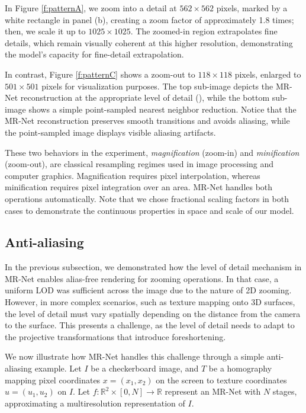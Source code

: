 In Figure \ref{f:patternA}, we zoom into a detail at \(562 \times 562\) pixels, marked by a white rectangle in panel (b), creating a zoom factor of approximately 1.8 times; then, we scale it up to \(1025 \times 1025\). The zoomed-in region extrapolates fine details, which remain visually coherent at this higher resolution, demonstrating the model's capacity for fine-detail extrapolation.

In contrast, Figure \ref{f:patternC} shows a zoom-out to \(118 \times 118\) pixels, enlarged to \(501 \times 501\) pixels for visualization purposes. The top sub-image depicts the MR-Net reconstruction at the appropriate level of detail (), while the bottom sub-image shows a simple point-sampled nearest neighbor reduction. Notice that the MR-Net reconstruction preserves smooth transitions and avoids aliasing, while the point-sampled image displays visible aliasing artifacts.

These two behaviors in the experiment, \textit{magnification} (zoom-in) and \textit{minification} (zoom-out), are classical resampling regimes used in image processing \citep{pixel} and computer graphics. Magnification requires pixel interpolation, whereas minification requires pixel integration over an area. MR-Net handles both operations automatically. Note that we chose fractional scaling factors in both cases to demonstrate the continuous properties in space and scale of our model.

\subsection{Anti-aliasing}

In the previous subsection, we demonstrated how the level of detail mechanism in MR-Net enables alias-free rendering for zooming operations. In that case, a uniform LOD was sufficient across the image due to the nature of 2D zooming. However, in more complex scenarios, such as texture mapping onto 3D surfaces, the level of detail must vary spatially depending on the distance from the camera to the surface. This presents a challenge, as the level of detail needs to adapt to the projective transformations that introduce foreshortening.

We now illustrate how MR-Net handles this challenge through a simple anti-aliasing example. Let \(I\) be a checkerboard image, and \(T\) be a homography mapping pixel coordinates \(x = (x_1, x_2)\) on the screen to texture coordinates \(u = (u_1, u_2)\) on \(I\). Let \(f: \mathbb{R}^2 \times [0, N] \to \mathbb{R}\) represent an MR-Net with \(N\) stages, approximating a multiresolution representation of \(I\).

